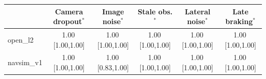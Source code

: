 \begin{tabular}{@{}lccccc@{}}
\toprule
 & Camera dropout$^{\ast}$ & Image noise$^{\ast}$ & Stale obs.$^{\ast}$ & Lateral noise$^{\ast}$ & Late braking$^{\ast}$ \\
\midrule
open\_l2 & 1.00\,{\scriptsize[1.00,1.00]} & 1.00\,{\scriptsize[1.00,1.00]} & 1.00\,{\scriptsize[1.00,1.00]} & 1.00\,{\scriptsize[1.00,1.00]} & 1.00\,{\scriptsize[1.00,1.00]} \\
navsim\_v1 & 1.00\,{\scriptsize[1.00,1.00]} & 1.00\,{\scriptsize[0.83,1.00]} & 1.00\,{\scriptsize[1.00,1.00]} & 1.00\,{\scriptsize[1.00,1.00]} & 1.00\,{\scriptsize[1.00,1.00]} \\
\bottomrule
\end{tabular}
